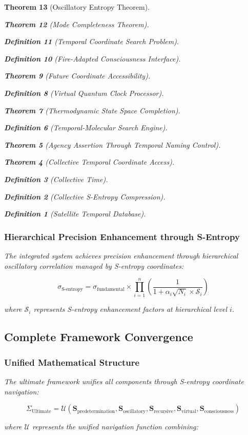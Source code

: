 \documentclass[12pt,a4paper]{article}
\newtheorem{theorem}{Theorem}[section]
\newtheorem{definition}[theorem]{Definition}
\begin{document}
\begin{theorem}[Oscillatory Entropy Theorem]
\begin{theorem}[Mode Completeness Theorem]
\begin{enumerate}
\begin{definition}[Temporal Coordinate Search Problem]
\begin{algorithm}
\begin{definition}[Fire-Adapted Consciousness Interface]
\begin{theorem}[Future Coordinate Accessibility]
\begin{definition}[Virtual Quantum Clock Processor]
\begin{itemize}
\begin{itemize}
\begin{theorem}[Thermodynamic State Space Completion]
\begin{definition}[Temporal-Molecular Search Engine]
\begin{theorem}[Agency Assertion Through Temporal Naming Control]
\begin{remark}
\begin{theorem}[Collective Temporal Coordinate Access]
\begin{definition}[Collective Time]
\begin{definition}[Collective S-Entropy Compression]
\begin{definition}[Satellite Temporal Database]
\begin{algorithm}
\begin{table}[h]
{{\subsubsection{Hierarchical Precision Enhancement through S-Entropy}

The integrated system achieves precision enhancement through hierarchical oscillatory correlation managed by S-entropy coordinates:

$$\sigma_{\text{S-entropy}} = \sigma_{\text{fundamental}} \times \prod_{i=1}^{n}\left(\frac{1}{1 + \alpha_i\sqrt{N_i} \times \mathcal{S}_i}\right)$$

where $\mathcal{S}_i$ represents S-entropy enhancement factors at hierarchical level $i$.

\subsection{Complete Framework Convergence}

\subsubsection{Unified Mathematical Structure}

The ultimate framework unifies all components through S-entropy coordinate navigation:

\begin{equation}
\Sigma_{\text{Ultimate}} = \mathcal{U}(\mathbf{S}_{\text{predetermination}}, \mathbf{S}_{\text{oscillatory}}, \mathbf{S}_{\text{recursive}}, \mathbf{S}_{\text{virtual}}, \mathbf{S}_{\text{consciousness}})
\end{equation}

where $\mathcal{U}$ represents the unified navigation function combining:

}}
\end{table}
\end{algorithm}
\end{definition}
\end{definition}
\end{definition}
\end{theorem}
\end{remark}
\end{theorem}
\end{definition}
\end{theorem}
\end{itemize}
\end{itemize}
\end{definition}
\end{theorem}
\end{definition}
\end{algorithm}
\end{definition}
\end{enumerate}
\end{theorem}
\end{theorem}
\end{document}
